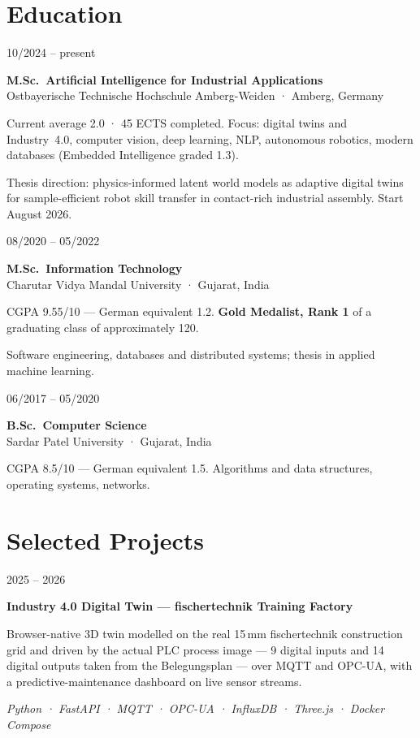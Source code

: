 \documentclass[10pt,a4paper]{article}
\newlength{\cvleft}\setlength{\cvleft}{30mm}
\newlength{\cvgap}\setlength{\cvgap}{5mm}
\newcommand{\cvrow}[2]{%
  \noindent\begin{minipage}[t]{\cvleft}\raggedright\strut #1\end{minipage}%
  \hspace{\cvgap}%
  \begin{minipage}[t]{\dimexpr\textwidth-\cvleft-\cvgap\relax}\strut #2\end{minipage}%
  \par\vspace{4.5pt}}
\newcommand{\dates}[1]{\sansfont\fontsize{9}{11}\selectfont\color{mid}#1}
\newcommand{\role}[1]{\textbf{#1}}
\newcommand{\org}[1]{{\color{mid}\fontsize{9.5}{12}\selectfont #1}}
\newcommand{\stack}[1]{{\fontsize{9}{11}\selectfont\color{mid}\textit{#1}}}
\begin{document}
\section{Education}
\cvrow{\dates{10/2024 – present}}{%
\role{M.Sc.\ Artificial Intelligence for Industrial Applications}\\
\org{Ostbayerische Technische Hochschule Amberg-Weiden · Amberg, Germany}
\begin{pts}
\item Current average 2.0 · 45 ECTS completed. Focus: digital twins and Industry~4.0, computer vision, deep learning, NLP, autonomous robotics, modern databases (Embedded Intelligence graded 1.3).
\item Thesis direction: physics-informed latent world models as adaptive digital twins for sample-efficient robot skill transfer in contact-rich industrial assembly. Start August 2026.
\end{pts}}


\cvrow{\dates{08/2020 – 05/2022}}{%
\role{M.Sc.\ Information Technology}\\
\org{Charutar Vidya Mandal University · Gujarat, India}
\begin{pts}
\item CGPA 9.55/10 — German equivalent 1.2. \textbf{Gold Medalist, Rank 1} of a graduating class of approximately 120.
\item Software engineering, databases and distributed systems; thesis in applied machine learning.
\end{pts}}


\cvrow{\dates{06/2017 – 05/2020}}{%
\role{B.Sc.\ Computer Science}\\
\org{Sardar Patel University · Gujarat, India}
\begin{pts}
\item CGPA 8.5/10 — German equivalent 1.5. Algorithms and data structures, operating systems, networks.
\end{pts}}

\section{Selected Projects}
\cvrow{\dates{2025 – 2026}}{%
\role{Industry 4.0 Digital Twin — fischertechnik Training Factory}\\
\begin{pts}
\item Browser-native 3D twin modelled on the real 15\,mm fischertechnik construction grid and driven by the actual PLC process image — 9 digital inputs and 14 digital outputs taken from the Belegungsplan — over MQTT and OPC-UA, with a predictive-maintenance dashboard on live sensor streams.
\end{pts}
\stack{Python · FastAPI · MQTT · OPC-UA · InfluxDB · Three.js · Docker Compose}}
\end{document}
